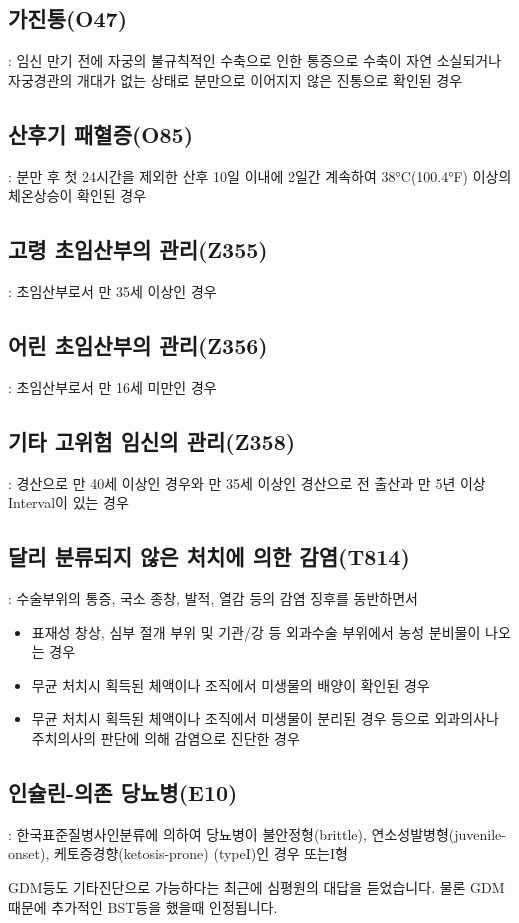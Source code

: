 \clearpage

\subsection*{가진통(O47)}
 : 임신 만기 전에 자궁의 불규칙적인 수축으로 인한 통증으로 수축이 자연 소실되거나 자궁경관의 개대가 없는 상태로 분만으로 이어지지 않은 진통으로 확인된 경우
\prezi{\clearpage}
\subsection*{산후기 패혈증(O85)} : 분만 후 첫 24시간을 제외한 산후 10일 이내에 2일간 계속하여 38°C(100.4°F) 이상의 체온상승이 확인된 경우
\prezi{\clearpage}
\subsection*{고령 초임산부의 관리(Z355)} : 초임산부로서 만 35세 이상인 경우 \label{oldprimi} 
\subsection*{어린 초임산부의 관리(Z356)} : 초임산부로서 만 16세 미만인 경우 \label{youngprimi} 
\subsection*{기타 고위험 임신의 관리(Z358)} : 경산으로 만 40세 이상인 경우와 만 35세 이상인 경산으로 전 출산과 만 5년 이상 Interval이 있는 경우 \label{otherhigh} 
\prezi{\clearpage}
\subsection*{달리 분류되지 않은 처치에 의한 감염(T814)} : 수술부위의 통증, 국소 종창, 발적, 열감 등의 감염 징후를 동반하면서
\begin{itemize}\tightlist
\item 표재성 창상, 심부 절개 부위 및 기관/강 등 외과수술 부위에서 농성 분비물이 나오는 경우
\item 무균 처치시 획득된 체액이나 조직에서 미생물의 배양이 확인된 경우
\item 무균 처치시 획득된 체액이나 조직에서 미생물이 분리된 경우 등으로 외과의사나 주치의사의 판단에 의해 감염으로 진단한 경우
\end{itemize}
\prezi{\clearpage}
\subsection*{인슐린-의존 당뇨병(E10)} : 한국표준질병사인분류에 의하여 당뇨병이 불안정형(brittle), 연소성발병형(juvenile-onset), 케토증경향(ketosis-prone) (typeI)인 경우 또는I형
\begin{shaded}
GDM등도 기타진단으로 가능하다는 최근에 심평원의 대답을 듣었습니다. 물론 GDM때문에 추가적인 BST등을 했을때 인정됩니다.
\end{shaded}
\clearpage

